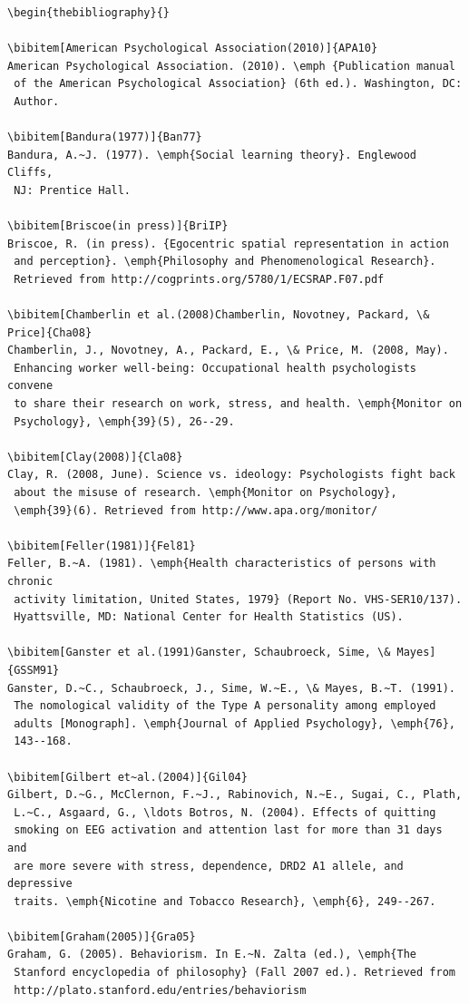 \documentclass[]{interact}
\theoremstyle{plain}%
\theoremstyle{definition}
\theoremstyle{remark}
\begin{document}
\begin{verbatim}
\begin{thebibliography}{}

\bibitem[American Psychological Association(2010)]{APA10}
American Psychological Association. (2010). \emph {Publication manual
 of the American Psychological Association} (6th ed.). Washington, DC:
 Author.

\bibitem[Bandura(1977)]{Ban77}
Bandura, A.~J. (1977). \emph{Social learning theory}. Englewood Cliffs,
 NJ: Prentice Hall.

\bibitem[Briscoe(in press)]{BriIP}
Briscoe, R. (in press). {Egocentric spatial representation in action
 and perception}. \emph{Philosophy and Phenomenological Research}.
 Retrieved from http://cogprints.org/5780/1/ECSRAP.F07.pdf

\bibitem[Chamberlin et al.(2008)Chamberlin, Novotney, Packard, \& Price]{Cha08}
Chamberlin, J., Novotney, A., Packard, E., \& Price, M. (2008, May).
 Enhancing worker well-being: Occupational health psychologists convene
 to share their research on work, stress, and health. \emph{Monitor on
 Psychology}, \emph{39}(5), 26--29.

\bibitem[Clay(2008)]{Cla08}
Clay, R. (2008, June). Science vs. ideology: Psychologists fight back
 about the misuse of research. \emph{Monitor on Psychology},
 \emph{39}(6). Retrieved from http://www.apa.org/monitor/

\bibitem[Feller(1981)]{Fel81}
Feller, B.~A. (1981). \emph{Health characteristics of persons with chronic
 activity limitation, United States, 1979} (Report No. VHS-SER10/137).
 Hyattsville, MD: National Center for Health Statistics (US).

\bibitem[Ganster et al.(1991)Ganster, Schaubroeck, Sime, \& Mayes]{GSSM91}
Ganster, D.~C., Schaubroeck, J., Sime, W.~E., \& Mayes, B.~T. (1991).
 The nomological validity of the Type A personality among employed
 adults [Monograph]. \emph{Journal of Applied Psychology}, \emph{76},
 143--168.

\bibitem[Gilbert et~al.(2004)]{Gil04}
Gilbert, D.~G., McClernon, F.~J., Rabinovich, N.~E., Sugai, C., Plath,
 L.~C., Asgaard, G., \ldots Botros, N. (2004). Effects of quitting
 smoking on EEG activation and attention last for more than 31 days and
 are more severe with stress, dependence, DRD2 A1 allele, and depressive
 traits. \emph{Nicotine and Tobacco Research}, \emph{6}, 249--267.

\bibitem[Graham(2005)]{Gra05}
Graham, G. (2005). Behaviorism. In E.~N. Zalta (ed.), \emph{The
 Stanford encyclopedia of philosophy} (Fall 2007 ed.). Retrieved from
 http://plato.stanford.edu/entries/behaviorism


\end{verbatim}
\end{document}
